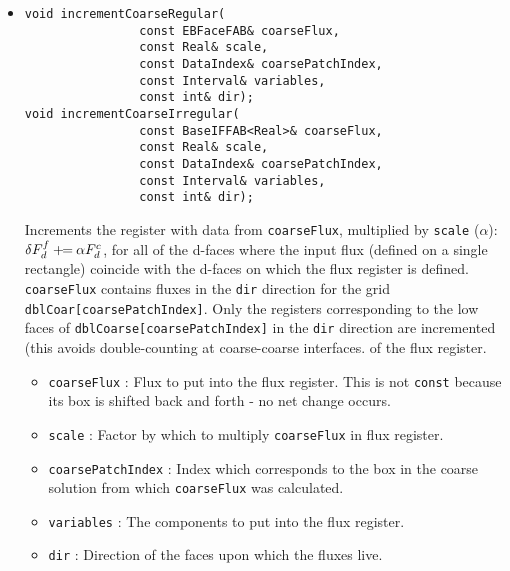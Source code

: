 \begin{itemize}
\item \begin{small}\begin{verbatim}
void incrementCoarseRegular(
                const EBFaceFAB& coarseFlux,
                const Real& scale,
                const DataIndex& coarsePatchIndex,
                const Interval& variables,
                const int& dir);
void incrementCoarseIrregular(
                const BaseIFFAB<Real>& coarseFlux,
                const Real& scale,
                const DataIndex& coarsePatchIndex,
                const Interval& variables,
                const int& dir);
\end{verbatim}\end{small}
Increments the register with data from \verb/coarseFlux/, multiplied by 
\verb/scale/ ($\alpha$):
$\delta F^f_d \mathbin{+\mkern-7mu=}  \alpha F^c_d$, for all of the d-faces where
the input flux (defined on a single rectangle) coincide with the d-faces on
which the flux register is defined. \verb/coarseFlux/ contains fluxes in
the \verb/dir/ direction for the grid \verb/dblCoar[coarsePatchIndex]/.
Only the registers corresponding to the low faces of
\verb/dblCoarse[coarsePatchIndex]/ in the \verb/dir/ direction
are incremented (this avoids double-counting at coarse-coarse interfaces.
of the flux register.
\begin{itemize}
\item
\verb/coarseFlux/ :
Flux to put into the flux register.
This is not \verb/const/ because its box is shifted back and forth -
no net change occurs.
\item
\verb/scale/ :
Factor by which to multiply \verb/coarseFlux/ in flux register.
\item
\verb/coarsePatchIndex/ :
Index which corresponds to the box in the coarse
solution from which \verb/coarseFlux/ was calculated.
\item
\verb/variables/ :
The components to put into the flux register.
\item
\verb/dir/ :
Direction of the faces upon which the fluxes live.
\end{itemize}


\end{itemize}
